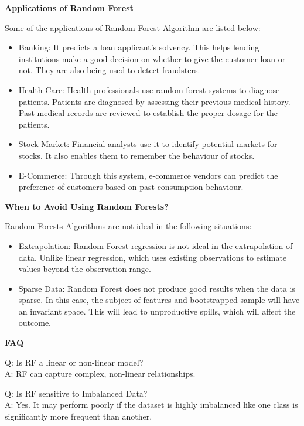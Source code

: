 \documentclass[
]{book}
\providecommand{\tightlist}{%
  \setlength{\itemsep}{0pt}\setlength{\parskip}{0pt}}
\begin{document}
\textbf{Applications of Random Forest}

Some of the applications of Random Forest Algorithm are listed below:

\begin{itemize}
\tightlist
\item
  Banking: It predicts a loan applicant's solvency. This helps lending institutions make a good decision on whether to give the customer loan or not. They are also being used to detect fraudsters.
\item
  Health Care: Health professionals use random forest systems to diagnose patients. Patients are diagnosed by assessing their previous medical history. Past medical records are reviewed to establish the proper dosage for the patients.
\item
  Stock Market: Financial analysts use it to identify potential markets for stocks. It also enables them to remember the behaviour of stocks.
\item
  E-Commerce: Through this system, e-commerce vendors can predict the preference of customers based on past consumption behaviour.
\end{itemize}

\textbf{When to Avoid Using Random Forests?}

Random Forests Algorithms are not ideal in the following situations:

\begin{itemize}
\tightlist
\item
  Extrapolation: Random Forest regression is not ideal in the extrapolation of data. Unlike linear regression, which uses existing observations to estimate values beyond the observation range.
\item
  Sparse Data: Random Forest does not produce good results when the data is sparse. In this case, the subject of features and bootstrapped sample will have an invariant space. This will lead to unproductive spills, which will affect the outcome.
\end{itemize}

\textbf{FAQ}

Q: Is RF a linear or non-linear model?\\
A: RF can capture complex, non-linear relationships.

Q: Is RF sensitive to Imbalanced Data?\\
A: Yes. It may perform poorly if the dataset is highly imbalanced like one class is significantly more frequent than another.
\end{document}
